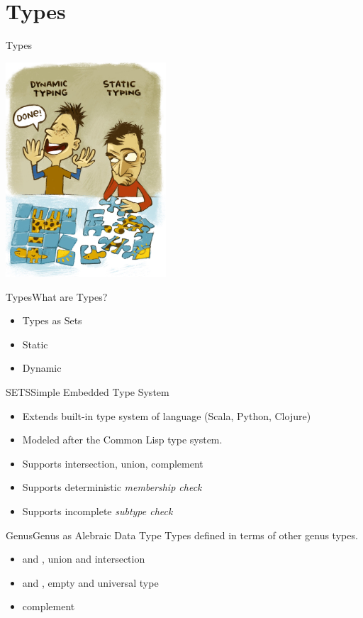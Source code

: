 \section{Types}
\begin{frame}{Types}
  \centering
  
    \includegraphics[height=8cm]{typing.png}
\end{frame}

\begin{frame}{Types}{What are Types?}
  \begin{itemize}
  \item Types as Sets
  \item Static
  \item Dynamic
  \end{itemize}
\end{frame}

\begin{frame}{SETS}{Simple Embedded Type System}

  \scalebox{1.0}{}

  \begin{itemize}
  \item   Extends built-in type system of language (Scala, Python, Clojure)
  \item   Modeled after the Common Lisp type system.
  \item   Supports intersection, union, complement
  \item   Supports deterministic \emph{membership check}
  \item   Supports incomplete \emph{subtype check}
  \end{itemize}
\end{frame}

\begin{frame}{Genus}{Genus as Alebraic Data Type}
  Types defined in terms of other genus types.

  \bigskip
  
  \begin{itemize}
  \item {} and , union and intersection
  \item {} and , empty and universal type
  \item {} complement
  \end{itemize}
\end{frame}

